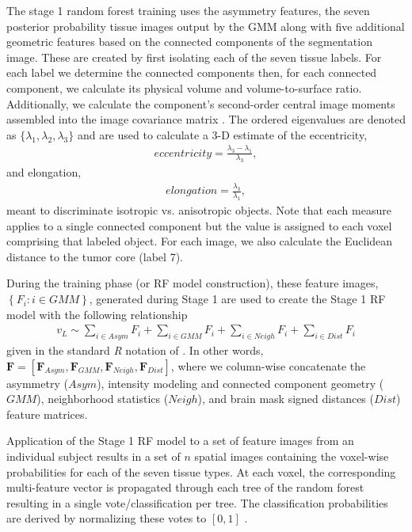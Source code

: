 \documentclass[preprint,authoryear,review,12pt]{elsarticle}
\begin{document}
The stage 1 random forest training uses the asymmetry features, the seven posterior probability
tissue images output by the GMM
along with five additional geometric features based on the connected 
components of the segmentation image.  These are created by first isolating
each of the seven tissue labels.  For each label we determine the connected
components then, for each connected component, we calculate its physical
volume and volume-to-surface ratio. Additionally, we calculate the component's 
second-order central image moments assembled into the image covariance matrix 
\citep{padfield2008}.  
The ordered eigenvalues are denoted as $\{\lambda_1,\lambda_2,\lambda_3\}$ and 
are used to calculate a 3-D estimate of the eccentricity,
\begin{align}
  eccentricity = \frac{\lambda_3 - \lambda_1}{\lambda_3},
\end{align}
and elongation,
\begin{align}
  elongation = \frac{\lambda_3}{\lambda_1},
\end{align}
meant to discriminate isotropic vs. anisotropic objects.
Note that each measure applies to a single connected component but
the value is assigned to each voxel comprising that labeled object.
For each image, we also calculate the Euclidean distance
to the tumor core (label 7).  

During the training phase (or RF model construction),
these feature images, $\left\{F_i: i \in GMM\right\}$, generated during Stage 1 are used to create
the Stage 1 RF model with the following relationship
\begin{align}
\label{eq:gmm}
 v_L \sim \sum_{i \in Asym} F_i + \sum_{i \in GMM} F_i + \sum_{i \in Neigh} F_i + \sum_{i \in Dist} F_i
\end{align}
given in the standard \textit{R} notation of \cite{wilkinson1973}.  
In other words, $\bm{F}= [ \bm{F}_{Asym}, \bm{F}_{GMM},
\bm{F}_{Neigh}, \bm{F}_{Dist} ]$, where we column-wise concatenate the asymmetry ($Asym$),
intensity modeling and connected component geometry ($GMM$), neighborhood statistics ($Neigh$),
 and brain mask signed distances ($Dist$) feature matrices.
 
Application of the Stage 1 RF model to a set of feature images 
from an individual subject results in a set of $n$ spatial images
containing the voxel-wise probabilities for each 
of the seven tissue types.  At each voxel, the corresponding multi-feature 
vector is propagated through each tree of the random forest 
resulting in a single vote/classification per tree.  The
classification probabilities are derived by normalizing 
these votes to $[0,1]$ \citep{liaw2002}. 
 
\end{document}
